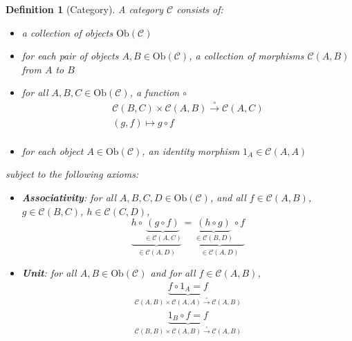 \documentclass{article}
\newtheorem{definition}{Definition}
\begin{document}
    \begin{definition}[Category]
        A category $\mathcal{C}$ consists of:
        \begin{itemize}
            \item a collection of objects $\text{Ob}(\mathcal{C})$
            \item for each pair of objects $A, B \in \text{Ob}(\mathcal{C})$, a collection of morphisms $\mathcal{C}(A, B)$ from $A$ to $B$
            \item for all $A, B, C \in \text{Ob}(\mathcal{C})$, a function $\circ$
            \begin{gather*}
                \mathcal{C}(B,C) \times \mathcal{C}(A,B) \stackrel{\circ}{\to} \mathcal{C}(A,C)\\
                (g, f) \mapsto g \circ f\\
            \end{gather*}
            \item for each object $A \in \text{Ob}(\mathcal{C})$, an identity morphism $1_A \in \mathcal{C}(A, A)$
        \end{itemize}

        subject to the following axioms:
        \begin{itemize}
            \item \textbf{Associativity}: for all $A, B, C, D \in \text{Ob}(\mathcal{C})$,
            and all $f \in \mathcal{C}(A, B)$, $g \in \mathcal{C}(B, C)$, $h \in \mathcal{C}(C, D)$,
            \[
                \underbrace{h \circ \underbrace{(g \circ f)}_{\in \mathcal{C}(A, C)}}_{\in \mathcal{C}(A, D)} = \underbrace{\underbrace{(h \circ g)}_{\in \mathcal{C}(B, D)} \circ f}_{\in \mathcal{C}(A, D)}
            \]
            \item \textbf{Unit}: for all $A, B \in \text{Ob}(\mathcal{C})$ and for all $f \in \mathcal{C}(A, B)$,
            \begin{gather*}
                \underbrace{f \circ 1_A = f}_{
                    \mathcal{C}(A, B) \times \mathcal{C}(A, A) \stackrel{\circ}{\to} \mathcal{C}(A, B)
                }\\
                \underbrace{ 1_B \circ f = f}_{
                    \mathcal{C}(B, B) \times \mathcal{C}(A, B) \stackrel{\circ}{\to} \mathcal{C}(A, B)
                }\\
            \end{gather*}
        \end{itemize}
    \end{definition}
\end{document}
